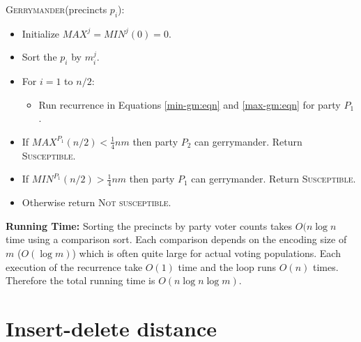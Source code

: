\documentclass[12pt]{article}
\begin{document}
\textsc{Gerrymander}(precincts $p_i$):

\begin{itemize}
\item
Initialize $MAX^{j} = MIN^{j}(0) = 0$.
\item
Sort the $p_i$ by $m^{j}_i$.
\item
For $i = 1$ to $n/2$:
\begin{itemize}
\item Run recurrence in Equations \ref{min-gm:eqn} and \ref{max-gm:eqn}
for party $P_1$.
\end{itemize}
\item If $MAX^{P_1}(n/2) < \frac{1}{4}nm$ then party $P_2$ can gerrymander.
      Return \textsc{Susceptible}.
\item If $MIN^{P_1}(n/2) > \frac{1}{4}nm$ then party $P_1$ can gerrymander.
      Return \textsc{Susceptible}.
\item Otherwise return \textsc{Not susceptible}.
\end{itemize}

\textbf{Running Time:} Sorting the precincts by party voter counts takes
$O(n\log{n}$ time using a comparison sort. Each comparison depends on the
encoding size of $m$ ($O(\log{m})$) which is often quite large for actual
voting
populations. Each execution of the recurrence
take $O(1)$ time and the loop runs $O(n)$ times. Therefore the total
running time is $O(n\log{n}\log{m})$.

\pagebreak

\section{Insert-delete distance}
\end{document}
